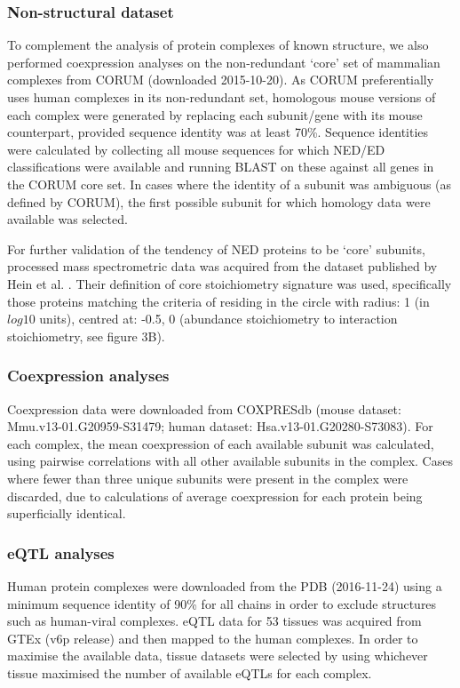 \documentclass[a4paper,11pt,twoside,openright]{scrbook}
\begin{document}
\subsubsection{Non-structural dataset}
To complement the analysis of protein complexes of known structure, we also performed coexpression analyses on the non-redundant `core' set of mammalian complexes from CORUM \cite{Ruepp2009} (downloaded 2015-10-20). As CORUM preferentially uses human complexes in its non-redundant set, homologous mouse versions of each complex were generated by replacing each subunit/gene with its mouse counterpart, provided sequence identity was at least 70\%. Sequence identities were calculated by collecting all mouse sequences for which NED/ED classifications were available and running BLAST on these against all genes in the CORUM core set. In cases where the identity of a subunit was ambiguous (as defined by CORUM), the first possible subunit for which homology data were available was selected.

For further validation of the tendency of NED proteins to be `core' subunits, processed mass spectrometric data was acquired from the dataset published by Hein et al. \cite{Hein2015}. Their definition of core stoichiometry signature was used, specifically those proteins matching the criteria of residing in the circle with radius: 1 (in $log{10}$ units), centred at: -0.5, 0 (abundance stoichiometry to interaction stoichiometry, see figure 3B\cite{Hein2015}).

\subsubsection{Coexpression analyses}
Coexpression data were downloaded from COXPRESdb \cite{Okamura2014} (mouse dataset: Mmu.v13-01.G20959-S31479; human dataset: Hsa.v13-01.G20280-S73083). For each complex, the mean coexpression of each available subunit was calculated, using pairwise correlations with all other available subunits in the complex. Cases where fewer than three unique subunits were present in the complex were discarded, due to calculations of average coexpression for each protein being superficially identical.

\subsubsection{eQTL analyses}
Human protein complexes were downloaded from the PDB (2016-11-24) using a minimum sequence identity of 90\% for all chains in order to exclude structures such as human-viral complexes. eQTL data for 53 tissues was acquired from GTEx (v6p release) and then mapped to the human complexes. In order to maximise the available data, tissue datasets were selected by using whichever tissue maximised the number of available eQTLs for each complex.
\end{document}
